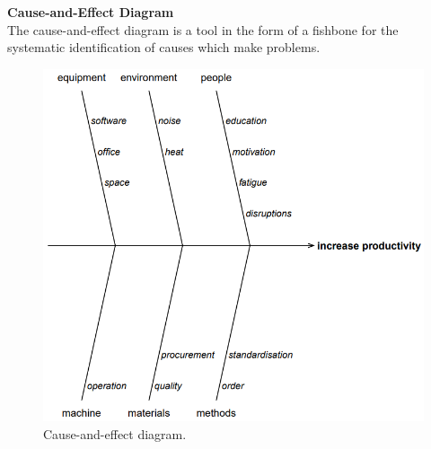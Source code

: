 \textbf{Cause-and-Effect Diagram}\\
The cause-and-effect diagram is a tool in the form of a fishbone for the systematic identification of causes which make problems.
\begin{figure}[H]
  \centering
  \includegraphics[width = 0.4\linewidth]{Pics/1.2.4.png}
  \caption{Cause-and-effect diagram.}
\end{figure}
